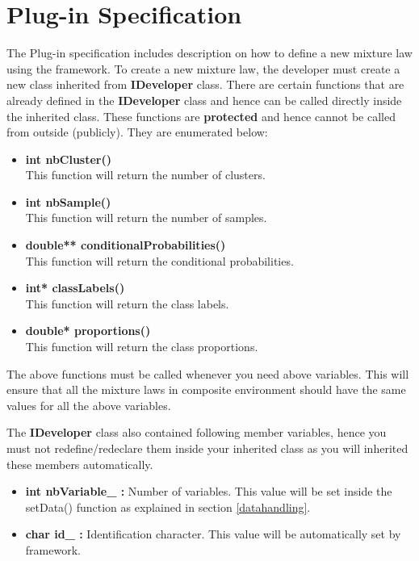 \documentclass[a4paper,11pt]{article}
\begin{document}
\section{Plug-in Specification}

The Plug-in specification includes description on how to define a new mixture law using the framework.
To create a new mixture law, the developer 
must create a new class inherited from {\bf IDeveloper} class.
There are certain functions that are already defined in the {\bf IDeveloper} 
class and hence can be called directly inside the inherited class. These functions are {\bf protected} and hence cannot be called from outside (publicly). 
They are enumerated below:
\begin{itemize}
 \item {\bf int nbCluster()}\\
This function will return the number of clusters.
 \item {\bf int nbSample()}\\
This function will return the number of samples.
\item {\bf double** conditionalProbabilities()}\\
This function will return the conditional probabilities. 
\item {\bf int* classLabels()}\\
This function will return the class labels.
\item {\bf double* proportions()}\\
This function will return the class proportions.
\end{itemize}

The above functions must be called whenever you need above variables. This will ensure that all the mixture laws in composite environment should have the same
values for all the above variables.

The {\bf IDeveloper} class also contained following member variables, hence you must not redefine/redeclare them inside your inherited class as you will inherited these members automatically.
\begin{itemize}
\item {\bf int nbVariable\_ : }Number of variables. This value will be set inside the setData() function as explained in section \ref{datahandling}. 
\item {\bf char id\_ : }Identification character. This value will be automatically set by framework. 
\end{itemize}
\end{document}
